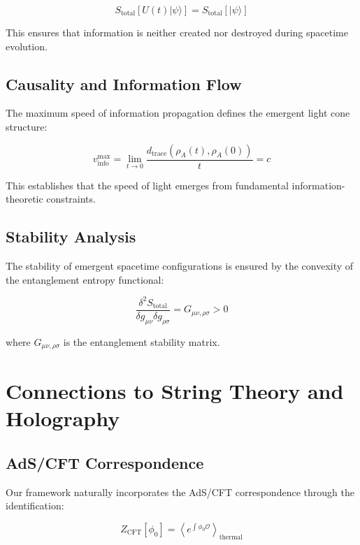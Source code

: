 \documentclass[twocolumn,showpacs,preprintnumbers,amsmath,amssymb,aps]{revtex4-1}
\begin{document}
\begin{equation}
S_{\text{total}}[U(t)|\psi\rangle] = S_{\text{total}}[|\psi\rangle]
\label{eq:unitarity}
\end{equation}

This ensures that information is neither created nor destroyed during spacetime evolution.

\subsection{Causality and Information Flow}

The maximum speed of information propagation defines the emergent light cone structure:

\begin{equation}
v_{\text{info}}^{\max} = \lim_{t \to 0} \frac{d_{\text{trace}}(\rho_A(t), \rho_A(0))}{t} = c
\label{eq:light_speed}
\end{equation}

This establishes that the speed of light emerges from fundamental information-theoretic constraints.

\subsection{Stability Analysis}

The stability of emergent spacetime configurations is ensured by the convexity of the entanglement entropy functional:

\begin{equation}
\frac{\delta^2 S_{\text{total}}}{\delta g_{\mu\nu} \delta g_{\rho\sigma}} = G_{\mu\nu,\rho\sigma} > 0
\label{eq:stability_matrix}
\end{equation}

where $G_{\mu\nu,\rho\sigma}$ is the entanglement stability matrix.

\section{Connections to String Theory and Holography}

\subsection{AdS/CFT Correspondence}

Our framework naturally incorporates the AdS/CFT correspondence through the identification:

\begin{equation}
Z_{\text{CFT}}[\phi_0] = \left\langle e^{\int \phi_0 \mathcal{O}} \right\rangle_{\text{thermal}}
\label{eq:ads_cft}
\end{equation}
\end{document}
